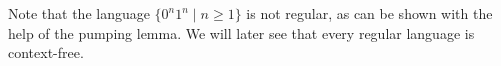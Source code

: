 

\setcounter{section}{5}
\setcounter{subsection}{1}
\setcounter{dfn}{4}


Note that the language $\{0^n1^n \mid n \ge 1\}$ is not regular, as can be shown with the help of the pumping lemma.
We will later see that every regular language is context-free.



